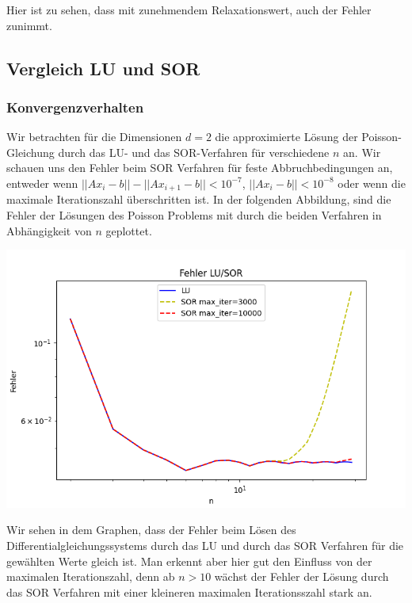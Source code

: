 \documentclass[smallheadings]{scrartcl}
\theoremstyle{definition}
\begin{document}
	Hier ist zu sehen, dass mit zunehmendem Relaxationswert, auch der Fehler zunimmt. 
	
		
\subsection{Vergleich LU und SOR}
\subsubsection{Konvergenzverhalten}

Wir betrachten für die Dimensionen $d=2$ die approximierte Lösung der Poisson-Gleichung durch das LU- und das SOR-Verfahren für verschiedene  $n$ an.   Wir schauen uns den Fehler beim SOR Verfahren für feste Abbruchbedingungen an,  entweder wenn $||Ax_i-b||-||Ax_{i+1}-b||<10^{-7}$, $||Ax_i-b||<10^{-8}$ oder wenn die maximale Iterationszahl überschritten ist.  In der folgenden Abbildung,  sind die Fehler der Lösungen des Poisson Problems mit durch die beiden Verfahren in Abhängigkeit von $n$ geplottet.




\begin{minipage}{\textwidth}

 \centering
 \includegraphics[scale = 0.8]{Errorlu1}
 	\label{errorcomp}

 \end{minipage}
 
 Wir sehen in dem Graphen, dass der Fehler beim Lösen des Differentialgleichungssystems durch das LU und durch das SOR Verfahren für die gewählten Werte gleich ist.  Man erkennt aber hier gut den Einfluss von der maximalen Iterationszahl, denn ab $n>10$ wächst der Fehler der Lösung durch das SOR Verfahren mit einer kleineren maximalen Iterationsszahl stark an.
 
\end{document}
